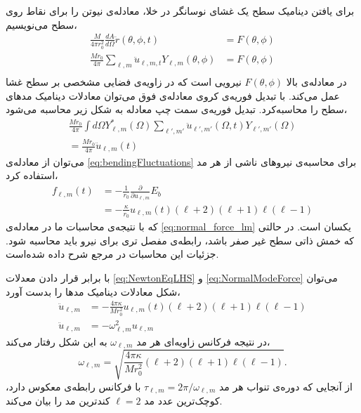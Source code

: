 برای یافتن دینامیک سطح یک غشای نوسانگر در خلا، معادله‌ی نیوتن را برای نقاط روی سطح می‌نویسیم،
\begin{equation}
\begin{aligned}
\frac{M}{4\pi r_0^2}\frac{dA}{d\Omega}\ddot r(\theta,\phi,t)&=F(\theta,\phi)\\
\frac{Mr_0}{4\pi}\sum_{\ell,m}\ddot u_{\ell,m,t}Y_{\ell,m}(\theta,\phi)&=F(\theta,\phi)\\
\end{aligned}
\label{eq:NewtonEqRaw}
\end{equation}
در معادله‌ی بالا
$F(\theta,\phi)$
نیرویی است که در زاویه‌ی فضایی مشخصی بر سطح غشا عمل می‌کند. با تبدیل فوریه‌ی کروی معادله‌ی فوق می‌توان معادلات دینامیک مد‌های سطح را محاسبه‌کرد. تبدیل فوریه‌ی سمت چپ معادله به شکل زیر محاسبه می‌شود،
\begin{equation}
\begin{aligned}
\frac{Mr_0}{4\pi}\int d\Omega Y_{\ell,m}^*(\Omega)\sum_{\ell',m'}\ddot u_{\ell',m'}(\Omega,t)Y_{\ell',m'}(\Omega)\\
=\frac{Mr_0}{4\pi}\ddot u_{\ell,m}(t)
\end{aligned}
\label{eq:NewtonEqLHS}
\end{equation}
می‌توان از معادله‌ی 
\ref{eq:bendingFluctuations}
برای محاسبه‌ی نیروهای ناشی از هر مد استفاده کرد،
\begin{equation}
\begin{aligned}
f_{\ell,m}(t)&=-\frac{1}{r_0}\frac{\partial}{\partial u_{\ell,m}}E_b\\
&=-\frac{\kappa}{r_0}u_{\ell,m}(t)(\ell+2)(\ell+1)\ell(\ell-1)
\end{aligned}
\label{eq:NormalModeForce}
\end{equation}
که با نتیجه‌ی محاسبات ما در معادله‌ی
\ref{eq:normal_force_lm}
یکسان است. در حالتی که خمش ذاتی سطح غیر صفر باشد، رابطه‌ی مفصل تری برای نیرو باید محاسبه شود. جزئیات این محاسبات در مرجع
\cite{milnersafranPRA1987}
شرح داده شده‌است.

با برابر قرار دادن معدلات 
\ref{eq:NewtonEqLHS}
و
\ref{eq:NormalModeForce}
می‌توان شکل معادلات دینامیک مد‌ها را بدست آورد،
\begin{equation}
\begin{aligned} 
\ddot u_{\ell,m}&=-\frac{4\pi\kappa}{Mr_0^2}u_{\ell,m}(t)(\ell+2)(\ell+1)\ell(\ell-1)\\
\ddot u_{\ell,m}&=-\omega_{\ell,m}^2u_{\ell,m}
\end{aligned}
\label{eq:NewtonModes}
\end{equation}
در نتیجه فرکانس زاویه‌ای هر مد
$\omega_{\ell,m}$
به این شکل رفتار می‌کند،
\begin{equation}
\omega_{\ell,m}=\sqrt{\frac{4\pi\kappa}{Mr_0^2}(\ell+2)(\ell+1)\ell(\ell-1)}.
\label{eq:NewtonModesFreq}
\end{equation}
از آنجایی که دوره‌ی تنواب هر مد 
$\tau_{\ell,m}=2\pi/\omega_{\ell,m}$
با فرکانس رابطه‌ی معکوس دارد، کوچک‌ترین عدد مد
$\ell=2$
کند‌ترین مد را بیان می‌کند.


